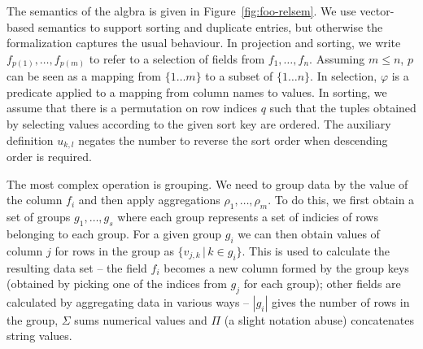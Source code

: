 \documentclass[a4paper,UKenglish]{lipics-v2016}
\theoremstyle{plain}
\theoremstyle{definition}
\begin{document}
The semantics of the algbra is given in Figure~\ref{fig:foo-relsem}. We use vector-based semantics
to support sorting and duplicate entries, but otherwise the formalization captures the usual
behaviour. In projection and sorting, we write $f_{p(1)}, \ldots, f_{p(m)}$ to refer to a selection
of fields from $f_1, \ldots, f_n$. Assuming $m\leq n$, $p$ can be seen as a mapping from $\{1\ldots m\}$
to a subset of $\{1\ldots n\}$. In selection, $\varphi$ is a predicate applied to a mapping from 
column names to values. In sorting, we assume that there is a permutation on row indices $q$ such
that the tuples obtained by selecting values according to the given sort key are ordered. The 
auxiliary definition $u_{k,l}$ negates the number to reverse the sort order when descending order
is required.

The most complex operation is grouping. We need to group data by the value of the column $f_i$ and
then apply aggregations $\rho_1,\ldots,\rho_m$. To do this, we first obtain a set of groups $g_1,\ldots, g_s$
where each group represents a set of indicies of rows belonging to each group. For a given group 
$g_i$ we can then obtain values of column $j$ for rows in the group as $\{v_{j,k}\,|\, k\in g_i\}$.
This is used to calculate the resulting data set -- the field $f_i$ becomes a new column formed
by the group keys (obtained by picking one of the indices from $g_j$ for each group); other fields
are calculated by aggregating data in various ways -- $|g_i|$ gives the number of rows in the group,
$\Sigma$ sums numerical values and $\Pi$ (a slight notation abuse) concatenates string values. 

\end{document}
